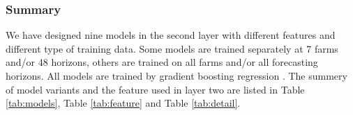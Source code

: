 \documentclass[conference]{IEEEtran}
\begin{document}
\subsubsection{Summary}
We have designed nine models in the second layer with different features and different type of training data. Some models are trained separately at 7 farms and/or 48 horizons, others are trained on all farms and/or all forecasting horizons. All models are trained by gradient boosting regression \cite{DBLP:journals/corr/ChenG16}. The summery of model variants and the feature used in layer two are listed in Table \ref{tab:models}, Table \ref{tab:feature} and Table \ref{tab:detail}.
\begin{table}[h]
\caption {Prediction Models in the Second Layer}
\begin{center}
\label{tab:models}
\end{center}
\vspace*{-1mm}
\end{table}
\end{document}
